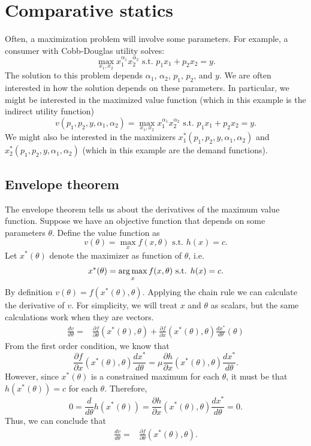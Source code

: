 \section{Comparative statics}

Often, a maximization problem will involve some parameters. For
example, a consumer with Cobb-Douglas utility solves:
\[ \max_{x_1,x_2} x_1^{\alpha_1} x_2^{\alpha_2} \text{ s.t. } p_1 x_1
+ p_2 x_2 = y. \]
The solution to this problem depends $\alpha_1$, $\alpha_2$, $p_1$,
$p_2$, and $y$. We are often interested in how the solution depends on
these parameters. In particular, we might be interested in the
maximized value function (which in this example is the indirect
utility function)
\[ v(p_1,p_2,y,\alpha_1,\alpha_2) = \max_{x_1,x_2} x_1^{\alpha_1}
x_2^{\alpha_2} \text{ s.t. } p_1 x_1 + p_2 x_2 = y. \]
We might also be interested in the maximizers
$x_1^*(p_1,p_2,y,\alpha_1,\alpha_2)$ and
$x_2^*(p_1,p_2,y,\alpha_1,\alpha_2)$ (which in this example are the
demand functions).  

\subsection{Envelope theorem}

The envelope theorem tells us about the derivatives of the maximum
value function. Suppose we have an objective function that depends on
some parameters $\theta$. Define the value function as
\[ v(\theta) = \max_x f(x,\theta) \text{ s.t. } h(x) = c. \]
Let $x^*(\theta)$ denote the maximizer as function of $\theta$, i.e. 
\[ x^*(\theta) = \argmax_x f(x,\theta) \text{ s.t. } h(x) = c. \]
By definition $v(\theta) = f(x^*(\theta), \theta)$. Applying the chain
rule we can calculate the derivative of $v$. For simplicity, we will
treat $x$ and $\theta$ as scalars, but the same calculations work when
they are vectors.
\begin{align*} 
  \frac{dv}{d\theta} = & \frac{\partial f}{\partial \theta}(x^*(\theta),\theta) +
  \frac{\partial f}{\partial x}(x^*(\theta),\theta) \frac{d x^*}{d\theta}(\theta)
\end{align*}
From the first order condition, we know that 
\[ 
\frac{\partial f}{\partial x}(x^*(\theta),\theta) \frac{dx^*}{d\theta}
= 
\mu
\frac{\partial h}{\partial x}(x^*(\theta),\theta)
\frac{dx^*}{d\theta}. 
\]
However, since $x^*(\theta)$ is a constrained maximum for each
$\theta$, it must be that $h(x^*(\theta)) = c$ for each
$\theta$. Therefore, 
\[ 0 = \frac{d}{d\theta} h(x^*(\theta)) = \frac{\partial h}{\partial
  x}(x^*(\theta),\theta) \frac{dx^*}{d\theta} = 0. \]
Thus, we can conclude that
\begin{align*} 
  \frac{dv}{d\theta} = & \frac{\partial f}{\partial
    \theta}(x^*(\theta),\theta).
\end{align*}

